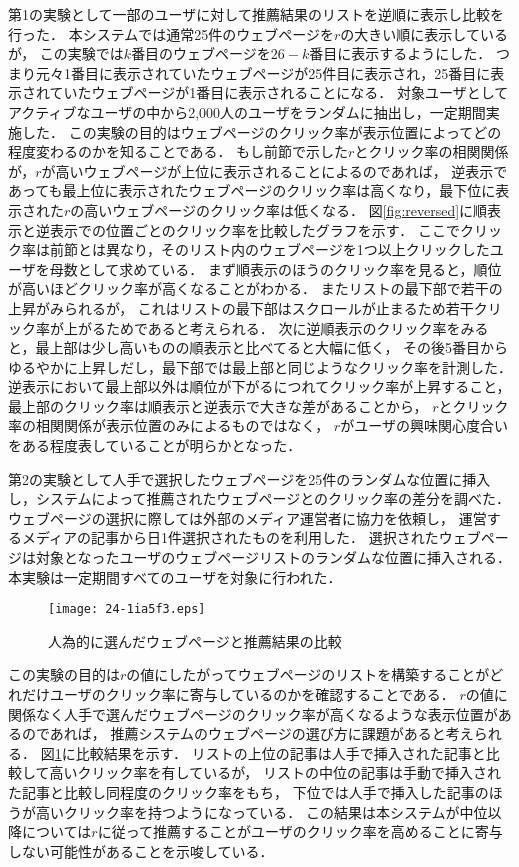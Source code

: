\documentclass[japanese]{jnlp_1.4}
\begin{document}
第1の実験として一部のユーザに対して推薦結果のリストを逆順に表示し比較を行った．
本システムでは通常25件のウェブページを$r$の大きい順に表示しているが，
この実験では$k$番目のウェブページを$26-k$番目に表示するようにした．
つまり元々1番目に表示されていたウェブページが25件目に表示され，25番目に表示されていたウェブページが1番目に表示されることになる．
対象ユーザとしてアクティブなユーザの中から2,000人のユーザをランダムに抽出し，一定期間実施した．
この実験の目的はウェブページのクリック率が表示位置によってどの程度変わるのかを知ることである．
もし前節で示した$r$とクリック率の相関関係が，$r$が高いウェブページが上位に表示されることによるのであれば，
逆表示であっても最上位に表示されたウェブページのクリック率は高くなり，最下位に表示された$r$の高いウェブページのクリック率は低くなる．
図\ref{fig:reversed}に順表示と逆表示での位置ごとのクリック率を比較したグラフを示す．
ここでクリック率は前節とは異なり，そのリスト内のウェブページを1つ以上クリックしたユーザを母数として求めている．
まず順表示のほうのクリック率を見ると，順位が高いほどクリック率が高くなることがわかる．
またリストの最下部で若干の上昇がみられるが，
これはリストの最下部はスクロールが止まるため若干クリック率が上がるためであると考えられる．
次に逆順表示のクリック率をみると，最上部は少し高いものの順表示と比べてると大幅に低く，
その後5番目からゆるやかに上昇しだし，最下部では最上部と同じようなクリック率を計測した．
逆表示において最上部以外は順位が下がるにつれてクリック率が上昇すること，
最上部のクリック率は順表示と逆表示で大きな差があることから，
$r$とクリック率の相関関係が表示位置のみによるものではなく，
$r$がユーザの興味関心度合いをある程度表していることが明らかとなった．

第2の実験として人手で選択したウェブページを25件のランダムな位置に挿入し，システムによって推薦されたウェブページとのクリック率の差分を調べた．
ウェブページの選択に際しては外部のメディア運営者に協力を依頼し，
運営するメディアの記事から日1件選択されたものを利用した．
選択されたウェブページは対象となったユーザのウェブページリストのランダムな位置に挿入される．
本実験は一定期間すべてのユーザを対象に行われた．

\begin{figure}[b]
\begin{center}
\texttt{[image: 24-1ia5f3.eps]}
\end{center}
\caption{人為的に選んだウェブページと推薦結果の比較}
\label{fig:logic_vs_manual}
\end{figure}

この実験の目的は$r$の値にしたがってウェブページのリストを構築することがどれだけユーザのクリック率に寄与しているのかを確認することである．
$r$の値に関係なく人手で選んだウェブページのクリック率が高くなるような表示位置があるのであれば，
推薦システムのウェブページの選び方に課題があると考えられる．
図\ref{fig:logic_vs_manual}に比較結果を示す．
リストの上位の記事は人手で挿入された記事と比較して高いクリック率を有しているが，
リストの中位の記事は手動で挿入された記事と比較し同程度のクリック率をもち，
下位では人手で挿入した記事のほうが高いクリック率を持つようになっている．
この結果は本システムが中位以降については$r$に従って推薦することがユーザのクリック率を高めることに寄与しない可能性があることを示唆している．
\end{document}
